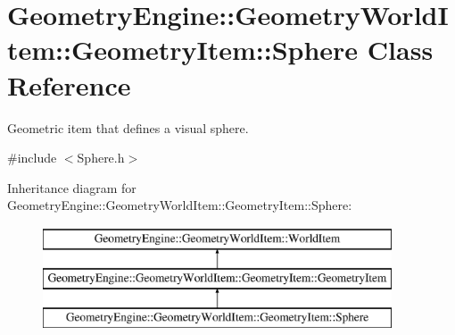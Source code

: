 \hypertarget{class_geometry_engine_1_1_geometry_world_item_1_1_geometry_item_1_1_sphere}{}\section{Geometry\+Engine\+::Geometry\+World\+Item\+::Geometry\+Item\+::Sphere Class Reference}
\label{class_geometry_engine_1_1_geometry_world_item_1_1_geometry_item_1_1_sphere}


Geometric item that defines a visual sphere.  




{\ttfamily \#include $<$Sphere.\+h$>$}

Inheritance diagram for Geometry\+Engine\+::Geometry\+World\+Item\+::Geometry\+Item\+::Sphere\+:\begin{figure}[H]
\begin{center}
\leavevmode
\includegraphics[height=3.000000cm]{class_geometry_engine_1_1_geometry_world_item_1_1_geometry_item_1_1_sphere}
\end{center}
\end{figure}
